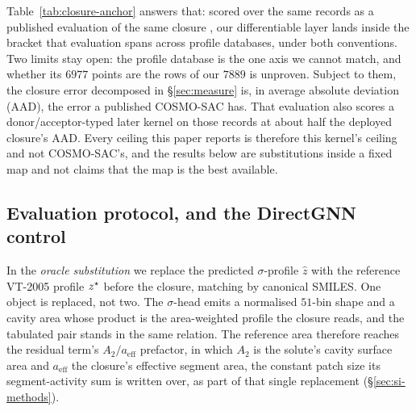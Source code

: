 Table~\ref{tab:closure-anchor} answers that: scored over the same records as a published evaluation
of the same closure \cite{desouza2025cosmosac}, our differentiable layer lands inside the bracket
that evaluation spans across profile databases, under both conventions. Two limits stay open: the
profile database is the one axis we cannot match, and whether its $6977$ points are the rows of our
$7889$ is unproven. Subject to them, the closure error decomposed in \S\ref{sec:measure} is,
in average absolute deviation (AAD), the error a published COSMO-SAC has. That evaluation also scores a donor/acceptor-typed
later kernel on those records at about half the deployed closure's AAD. Every ceiling this paper
reports is therefore this kernel's ceiling and not COSMO-SAC's, and the results below are
substitutions inside a fixed map and not claims that the map is the best available.

\subsection{Evaluation protocol, and the DirectGNN control}
\label{sec:eval}
In the \emph{oracle substitution} we replace the predicted $\sigma$-profile $\hat z$ with the
reference VT-2005 profile $z^\star$ before the closure, matching by canonical SMILES. One object is
replaced, not two. The $\sigma$-head emits a normalised $51$-bin shape and a cavity area whose
product is the area-weighted profile the closure reads, and the tabulated pair stands in the same
relation. The reference area therefore reaches the residual term's $A_2/a_{\mathrm{eff}}$ prefactor,
in which $A_2$ is the solute's cavity surface area and $a_{\mathrm{eff}}$ the closure's
effective segment area, the constant patch size its segment-activity sum is written over,
as part of that single replacement (\S\ref{sec:si-methods}).


